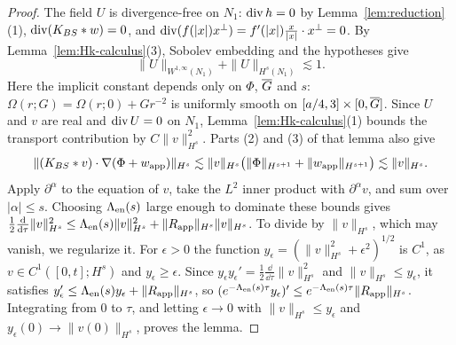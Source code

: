 \begin{proof}
The field $U$ is divergence-free on $N_1$: $\operatorname{div} h=0$ by
Lemma~\ref{lem:reduction}\textup{(1)}, $\operatorname{div}(K_{BS}\ast w)=0$, and
$\operatorname{div}(f(|x|)x^\perp)=f'(|x|)\frac{x}{|x|}\cdot x^\perp=0$. By
Lemma~\ref{lem:Hk-calculus}\textup{(3)}, Sobolev embedding and the hypotheses give
\[
\|U\|_{W^{1,\infty}(N_1)}+\|U\|_{H^s(N_1)}\lesssim1.
\]
Here the implicit constant depends only on $\Phi$, $\overline{G}$ and $s$:
$\Omega(r;G)=\Omega(r;0)+Gr^{-2}$ is uniformly smooth on
$[a/4,3]\times[0,\overline{G}]$. Since $U$ and $v$ are real and $\operatorname{div} U=0$ on
$N_1$, Lemma~\ref{lem:Hk-calculus}\textup{(1)} bounds the transport contribution
by $C\|v\|_{H^s}^2$. Parts \textup{(2)} and \textup{(3)} of that lemma also give
\[
\|(K_{BS}\ast v)\cdot\nabla(\Phi+w_{\mathrm{app}})\|_{H^s}
\lesssim\|v\|_{H^s}
\big(\|\Phi\|_{H^{s+1}}+\|w_{\mathrm{app}}\|_{H^{s+1}}\big)
\lesssim\|v\|_{H^s}.
\]
Apply $\partial^\alpha$ to the equation of $v$, take the $L^2$ inner product
with $\partial^\alpha v$, and sum over $|\alpha|\le s$. Choosing $\Lambda_{\mathrm{en}}(s)$
large enough to dominate these bounds gives
$\frac12\frac{\dd}{\dd\tau}\|v\|_{H^s}^2\le\Lambda_{\mathrm{en}}(s)\|v\|_{H^s}^2+\|R_{\mathrm{app}}\|_{H^s}\|v\|_{H^s}$.
To divide by $\|v\|_{H^s}$, which may vanish, we regularize it. For $\epsilon>0$
the function $y_\epsilon=(\|v\|_{H^s}^2+\epsilon^2)^{1/2}$ is $C^1$, as
$v\in C^1([0,t];H^s)$ and $y_\epsilon\ge\epsilon$. Since
$y_\epsilon y_\epsilon'=\frac12\frac{\dd}{\dd\tau}\|v\|_{H^s}^2$ and
$\|v\|_{H^s}\le y_\epsilon$, it satisfies
$y_\epsilon'\le\Lambda_{\mathrm{en}}(s)y_\epsilon+\|R_{\mathrm{app}}\|_{H^s}$, so
$(e^{-\Lambda_{\mathrm{en}}(s)\tau}y_\epsilon)'\le e^{-\Lambda_{\mathrm{en}}(s)\tau}\|R_{\mathrm{app}}\|_{H^s}$.
Integrating from $0$ to $\tau$, and letting $\epsilon\to0$ with
$\|v\|_{H^s}\le y_\epsilon$ and $y_\epsilon(0)\to\|v(0)\|_{H^s}$, proves the lemma.
\end{proof}

